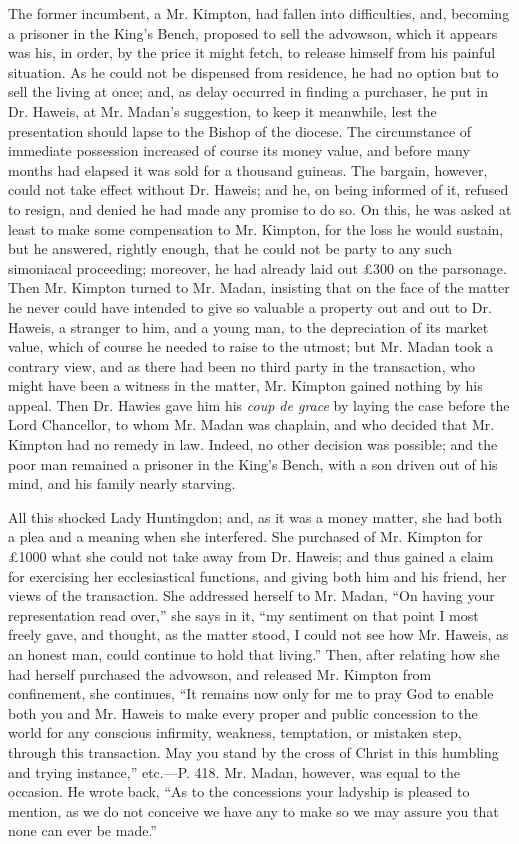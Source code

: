 The former incumbent, a Mr. Kimpton, had fallen
into difficulties, and, becoming a prisoner in the King's Bench,
proposed to sell the advowson, which it appears was his, in order, by
the price it might fetch, to release himself from his painful
situation. As he could not be dispensed from residence, he had no
option but to sell the living at once; and, as delay occurred in
finding a purchaser, he put in Dr. Haweis, at Mr. Madan's suggestion,
to keep it meanwhile, lest the presentation should lapse to the Bishop of the diocese. The circumstance of immediate possession
increased of course its money value, and before many months had
elapsed it was sold for a thousand guineas. The bargain, however,
could not take effect without Dr. Haweis; and he, on being informed of
it, refused to resign, and denied he had made any promise to do so. On
this, he was asked at least to make some compensation to Mr. Kimpton,
for the loss he would sustain, but he answered, rightly enough, that
he could not be party to any such simoniacal proceeding; moreover, he
had already laid out £300 on the parsonage. Then Mr. Kimpton turned
to Mr. Madan, insisting that on the face of the matter he never could
have intended to give so valuable a property out and out to Dr. Haweis,
a stranger to him, and a young man, to the depreciation of its market
value, which of course he needed to raise to the utmost; but Mr. Madan
took a contrary view, and as there had been no third party in the
transaction, who might have been a witness in the matter, Mr. Kimpton
gained nothing by his appeal. Then Dr. Hawies gave him his \emph{coup de
grace} by laying the case before the Lord Chancellor, to whom Mr.
Madan was chaplain, and who decided that Mr. Kimpton had no remedy in
law. Indeed, no other decision was possible; and the poor man remained
a prisoner in the King's Bench, with a son driven out of his mind, and
his family nearly starving.

All this shocked Lady Huntingdon; and, as it was
a money matter, she had both a plea and a meaning when she interfered.
She purchased of Mr. Kimpton for £1000 what she could not take away
from Dr. Haweis; and thus gained a claim for exercising her
ecclesiastical functions, and giving both him and his friend, her
views of the transaction. She addressed herself to Mr. Madan, ``On
having your representation read over,'' she says in it, ``my
sentiment on that point I most freely gave, and thought, as the matter
stood, I could not see how Mr. Haweis, as an honest man, could
continue to hold that living.'' Then, after relating how she had
herself purchased the advowson, and released Mr. Kimpton from
confinement, she continues, ``It remains now only for me to pray God to
enable both you and Mr. Haweis to make every proper and public
concession to the world for any conscious infirmity, weakness,
temptation, or mistaken step, through this transaction. May you stand
by the cross of Christ in this humbling and trying instance,''
etc.—P. 418. Mr. Madan, however, was equal to the occasion. He wrote
back, ``As to the concessions your ladyship is pleased to mention, as
we do not conceive we have any to make so we may assure you that none
can ever be made.''

